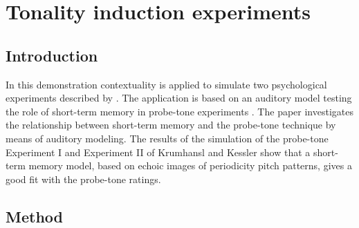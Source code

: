 \newpage
\section{Tonality induction experiments}

\hypertarget{Concepts:IPEMGenerateProbes}{}
\hypertarget{Concepts:IPEMProbeToneExperimentKK1}{}
\hypertarget{Concepts:IPEMProbeToneExperimentKK2}{}

\subsection{Introduction}

In this demonstration contextuality is applied to simulate two
psychological experiments described by
. The application is based on an
auditory model testing the role of short-term memory in probe-tone
experiments . The paper investigates the
relationship between short-term memory and the probe-tone
technique by means of auditory modeling. The results of the
simulation of the probe-tone Experiment I and Experiment II of
Krumhansl and Kessler show that a short-term memory model, based
on echoic images of periodicity pitch patterns, gives a good fit
with the probe-tone ratings.

\subsection{Method}

